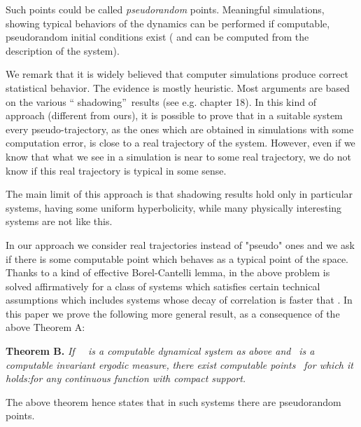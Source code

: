\documentclass[copyright,creativecommons]{eptcs}
\numberwithin{equation}{section}
\begin{document}
Such points could be called \emph{pseudorandom} points. Meaningful
simulations, showing typical behaviors of the dynamics can be performed if
computable, pseudorandom initial conditions exist ( and can be computed from the
description of the system).

We remark that it is widely believed that computer simulations produce
correct statistical behavior. The evidence is mostly heuristic. Most
arguments are based on the various \textquotedblleft
shadowing\textquotedblright\ results (see e.g. \cite{KH} chapter 18). In
this kind of approach (different from ours), it is possible to prove that in
a suitable system every pseudo-trajectory, as the ones which are obtained in
simulations with some computation error, is close to a real trajectory of
the system. However, even if we know that what we see in a simulation is
near to some real trajectory, we do not know if this real trajectory is
typical in some sense.

The main limit of this approach is that shadowing results hold only in
particular systems, having some uniform hyperbolicity, while many physically
interesting systems are not like this.

In our approach we consider real trajectories instead of "pseudo" ones and
we ask if there is some computable point which behaves as a typical point of
the space. Thanks to a kind of effective Borel-Cantelli lemma, in \cite {GHR07} the above problem is solved affirmatively for a class of systems
which satisfies certain technical assumptions which includes systems whose
decay of correlation is faster that . In this paper we
prove the following more general result, as a consequence of the above
Theorem A:\newline

\noindent \textbf{Theorem B. }\emph{If \ }\emph{\ is a
computable dynamical system as above and }\emph{\ is a computable
invariant ergodic measure,} \emph{there exist computable points }\emph{\ for which it holds:}\emph{for any continuous function  with compact
support.} \newline

The above theorem hence states that in such systems there are pseudorandom
points.
\end{document}
